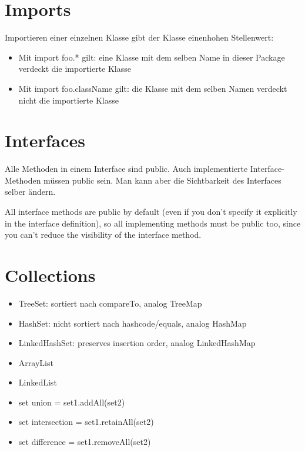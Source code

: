 \documentclass[UTF8]{article}
\begin{document}
\section{Imports}

Importieren einer einzelnen Klasse gibt der Klasse einenhohen Stellenwert:

\begin{itemize}
    \item Mit import foo.* gilt: eine Klasse mit dem selben Name in dieser Package verdeckt die importierte Klasse
    \item Mit import foo.className gilt: die Klasse mit dem selben Namen verdeckt nicht die importierte Klasse
\end{itemize}

\section{Interfaces}

Alle Methoden in einem Interface sind public. Auch implementierte Interface-Methoden müssen public sein. Man kann aber die Sichtbarkeit des Interfaces selber ändern.

All interface methods are public by default (even if you don't specify it explicitly in the interface definition), so all implementing methods must be public too, since you can't reduce the visibility of the interface method.

\section{Collections}

\begin{itemize}
    \item TreeSet: sortiert nach compareTo, analog TreeMap
    \item HashSet: nicht sortiert nach hashcode/equals, analog HashMap
    \item LinkedHashSet: preserves insertion order, analog LinkedHashMap
    \item ArrayList
    \item LinkedList
\end{itemize}

\begin{itemize}
    \item set union = set1.addAll(set2)
    \item set intersection = set1.retainAll(set2)
    \item set difference = set1.removeAll(set2)
\end{itemize}
\end{document}
